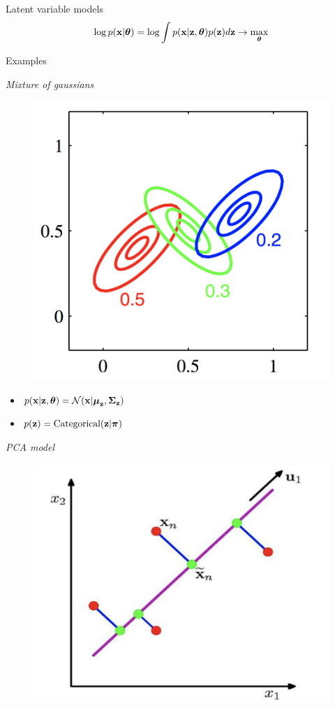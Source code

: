 \begin{frame}{Latent variable models}
    \[
    \log p(\mathbf{x} | \boldsymbol{\theta}) = \log \int p(\mathbf{x} | \mathbf{z}, \boldsymbol{\theta}) p(\mathbf{z}) d\mathbf{z} \rightarrow \max_{\boldsymbol{\theta}}
    \]
    \vspace{-0.6cm}
    \begin{block}{Examples}
    \begin{minipage}[t]{0.45\columnwidth}
		\textit{Mixture of gaussians} \\
		\vspace{-0.5cm}
		\begin{figure}
			\centering
			\includegraphics[width=0.75\linewidth]{figs/mixture_of_gaussians.png}
		\end{figure}
		\vspace{-0.5cm}
	    \begin{itemize}
	        \item $p(\mathbf{x} | \mathbf{z}, \boldsymbol{\theta}) = \mathcal{N}(\mathbf{x} | \boldsymbol{\mu}_{\mathbf{z}}, \boldsymbol{\Sigma}_{\mathbf{z}})$
	        \item $p(\mathbf{z}) = \text{Categorical}(\mathbf{z} | \boldsymbol{\pi})$
	    \end{itemize}
	\end{minipage}%
	\begin{minipage}[t]{0.53\columnwidth}
		\textit{PCA model} \\
		\vspace{-0.5cm}
		\begin{figure}
			\centering
			\includegraphics[width=.7\linewidth]{figs/pca.png}

\end{figure}
\end{minipage}
\end{block}
\end{frame}
